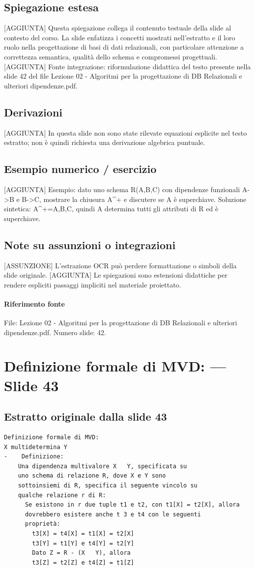 \documentclass[11pt]{article}
\begin{document}
\subsection*{Spiegazione estesa}
[AGGIUNTA] Questa spiegazione collega il contenuto testuale della slide al contesto del corso. La slide enfatizza i concetti mostrati nell'estratto e il loro ruolo nella progettazione di basi di dati relazionali, con particolare attenzione a correttezza semantica, qualità dello schema e compromessi progettuali.
[AGGIUNTA] Fonte integrazione: riformulazione didattica del testo presente nella slide 42 del file Lezione 02 - Algoritmi per la progettazione di DB Relazionali e ulteriori dipendenze.pdf.
\subsection*{Derivazioni}
[AGGIUNTA] In questa slide non sono state rilevate equazioni esplicite nel testo estratto; non è quindi richiesta una derivazione algebrica puntuale.
\subsection*{Esempio numerico / esercizio}
[AGGIUNTA] Esempio: dato uno schema R(A,B,C) con dipendenze funzionali A->B e B->C, mostrare la chiusura A^+ e discutere se A è superchiave. Soluzione sintetica: A^+={A,B,C}, quindi A determina tutti gli attributi di R ed è superchiave.
\subsection*{Note su assunzioni o integrazioni}
[ASSUNZIONE] L'estrazione OCR può perdere formattazione o simboli della slide originale.
[AGGIUNTA] Le spiegazioni sono estensioni didattiche per rendere espliciti passaggi impliciti nel materiale proiettato.
\paragraph{Riferimento fonte} File: Lezione 02 - Algoritmi per la progettazione di DB Relazionali e ulteriori dipendenze.pdf. Numero slide: 42.
\section{Definizione formale di MVD: --- Slide 43}
\subsection*{Estratto originale dalla slide 43}
\begin{lstlisting}
Definizione formale di MVD:
X multidetermina Y
-    Definizione:
    Una dipendenza multivalore X   Y, specificata su
    uno schema di relazione R, dove X e Y sono
    sottoinsiemi di R, specifica il seguente vincolo su
    qualche relazione r di R:
      Se esistono in r due tuple t1 e t2, con t1[X] = t2[X], allora
      dovrebbero esistere anche t 3 e t4 con le seguenti
      proprietà:
        t3[X] = t4[X] = t1[X] = t2[X]
        t3[Y] = t1[Y] e t4[Y] = t2[Y]
        Dato Z = R - (X   Y), allora
        t3[Z] = t2[Z] e t4[Z] = t1[Z]
\end{lstlisting}
\end{document}
